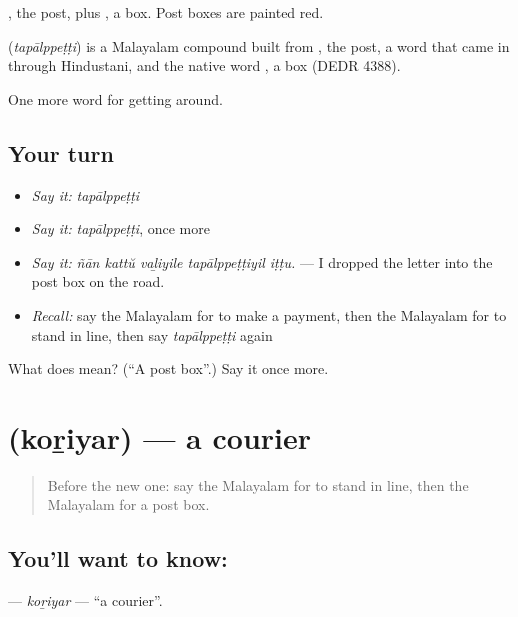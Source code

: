 , the post, plus , a box. Post boxes are painted red.

\begin{cousinweb}
\textbf{} (\emph{tapālppeṭṭi}) is a Malayalam compound built from , the post, a word that came in through Hindustani, and the native word , a box (DEDR 4388).
\end{cousinweb}

\begin{grammarlens}[title={What you've built}]
One more word for getting around.
\end{grammarlens}

\subsection*{Your turn}
\begin{itemize}
\raggedright
  \item \emph{Say it:} \emph{tapālppeṭṭi}
  \item \emph{Say it:} \emph{tapālppeṭṭi}, once more
  \item \emph{Say it:} \emph{ñān kattŭ vaḻiyile tapālppeṭṭiyil iṭṭu.} — I dropped the letter into the post box on the road.
  \item \emph{Recall:} say the Malayalam for to make a payment, then the Malayalam for to stand in line, then say \emph{tapālppeṭṭi} again
\end{itemize}

\begin{tcolorbox}[breakable,colback=teal!4,colframe=teal!35!black,title={Before you move on}]
What does  mean? (\textquotedblleft{}A post box\textquotedblright{}.) Say it once more.
\end{tcolorbox}
\section[\texorpdfstring{\ml{കൊറിയർ} (koṟiyar)}{കൊറിയർ (koṟiyar)}]{ (koṟiyar) — a courier}

\label{lesson:ML-C490-koriyar}



\begin{quote}
Before the new one: say the Malayalam for to stand in line, then the Malayalam for a post box.
\end{quote}

\subsection*{You'll want to know: }
\textbf{} — \emph{koṟiyar} — \textquotedblleft{}a courier\textquotedblright{}.

